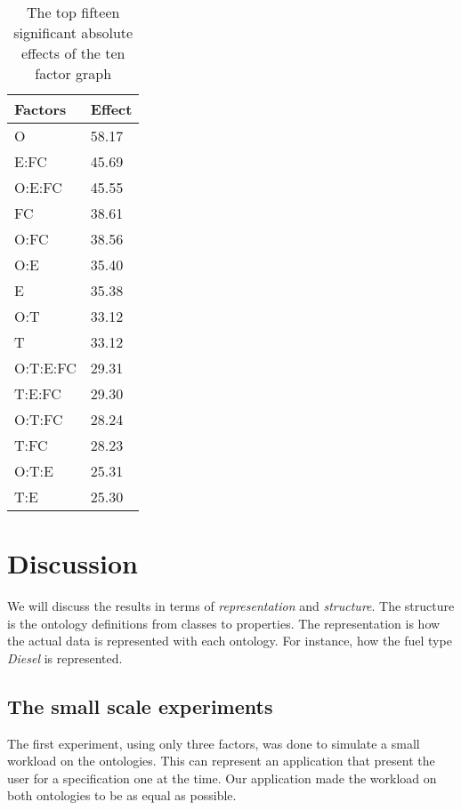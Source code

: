 \documentclass{llncs}
\begin{document}
\begin{wraptable}{l}{0.25\textwidth}
\vspace{-25pt}
    \begin{tabular}{ | l l |}
    \hline
    {\bf Factors} & {\bf Effect}  \\ \hline
      O & 58.17 \\ \hline
      E:FC & 45.69 \\ \hline
      O:E:FC & 45.55\\ \hline
      FC & 38.61\\ \hline
      O:FC & 38.56\\ \hline
      O:E & 35.40\\ \hline
      E & 35.38\\ \hline
      O:T & 33.12\\ \hline
      T & 33.12\\ \hline
      O:T:E:FC & 29.31\\ \hline
      T:E:FC & 29.30\\ \hline
      O:T:FC & 28.24\\ \hline
      T:FC & 28.23\\ \hline
      O:T:E & 25.31\\ \hline
      T:E & 25.30\\ \hline
    \end{tabular}
\caption{The top fifteen significant absolute effects of the ten factor graph}\label{10factorEffect}
      \vspace{-75pt}
\end{wraptable}


\section{Discussion}

We will discuss the results in terms of \emph{representation} and
\emph{structure}. The structure is the ontology definitions from
classes to properties.  The representation is how the actual data is
represented with each ontology. For instance, how the fuel type
\emph{Diesel} is represented.

\subsection{The small scale experiments}
The first experiment, using only three factors, was done to simulate a
small workload on the ontologies. This can represent an application
that present the user for a specification one at the time. 
Our application made the workload on both ontologies to be as equal as
possible. 
\end{document}

